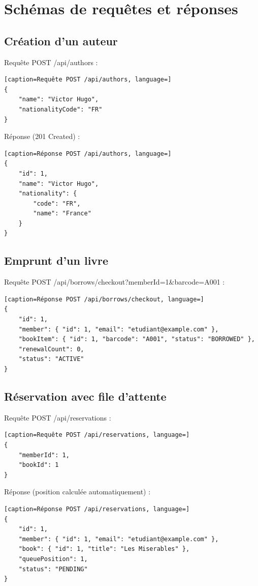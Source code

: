 \documentclass[12pt,a4paper,twoside]{report}
\begin{document}
\section{Schémas de requêtes et réponses}

\subsection{Création d'un auteur}

Requête POST /api/authors :

\begin{lstlisting}[caption=Requête POST /api/authors, language=]
{
    "name": "Victor Hugo",
    "nationalityCode": "FR"
}
\end{lstlisting}

Réponse (201 Created) :

\begin{lstlisting}[caption=Réponse POST /api/authors, language=]
{
    "id": 1,
    "name": "Victor Hugo",
    "nationality": {
        "code": "FR",
        "name": "France"
    }
}
\end{lstlisting}

\subsection{Emprunt d'un livre}

Requête POST /api/borrows/checkout?memberId=1\&barcode=A001 :

\begin{lstlisting}[caption=Réponse POST /api/borrows/checkout, language=]
{
    "id": 1,
    "member": { "id": 1, "email": "etudiant@example.com" },
    "bookItem": { "id": 1, "barcode": "A001", "status": "BORROWED" },
    "renewalCount": 0,
    "status": "ACTIVE"
}
\end{lstlisting}

\subsection{Réservation avec file d'attente}

Requête POST /api/reservations :

\begin{lstlisting}[caption=Requête POST /api/reservations, language=]
{
    "memberId": 1,
    "bookId": 1
}
\end{lstlisting}

Réponse (position calculée automatiquement) :

\begin{lstlisting}[caption=Réponse POST /api/reservations, language=]
{
    "id": 1,
    "member": { "id": 1, "email": "etudiant@example.com" },
    "book": { "id": 1, "title": "Les Miserables" },
    "queuePosition": 1,
    "status": "PENDING"
}
\end{lstlisting}
\end{document}
